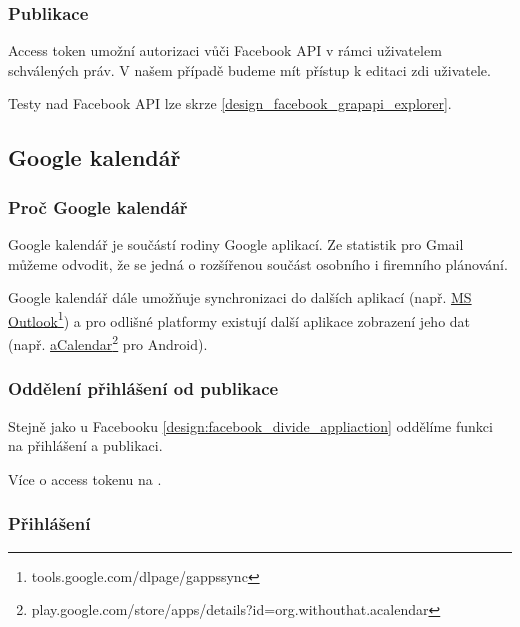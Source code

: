 \documentclass[thesis=B,czech]{FITthesis}[2012/06/26]
\begin{document}
\subsubsection{Publikace}

Access token umožní autorizaci vůči Facebook API v rámci uživatelem schválených práv. V našem případě budeme mít přístup k editaci zdi uživatele.

Testy nad Facebook API lze skrze \ref{design_facebook_grapapi_explorer}.


\subsection{Google kalendář}

\subsubsection{Proč Google kalendář}

Google kalendář je součástí rodiny Google aplikací\cite{design_google_apps}. Ze statistik pro Gmail\cite{design_google_usage} můžeme odvodit, že se jedná o rozšířenou součást osobního i firemního plánování.

Google kalendář dále umožňuje synchronizaci do dalších aplikací (např. \href{''https://tools.google.com/dlpage/gappssync''}{MS Outlook}\footnote{tools.google.com/dlpage/gappssync}) a pro odlišné platformy existují další aplikace zobrazení jeho dat (např. \href{''https://play.google.com/store/apps/details?id=org.withouthat.acalendar&hl=cs''}{aCalendar}\footnote{play.google.com/store/apps/details?id=org.withouthat.acalendar} pro Android). 

\subsubsection{Oddělení přihlášení od publikace}

Stejně jako u Facebooku \ref{design:facebook_divide_appliaction} oddělíme funkci na přihlášení a publikaci.

Více o access tokenu na \cite{design_google_access_token_guilde}.

\subsubsection{Přihlášení}
\end{document}

